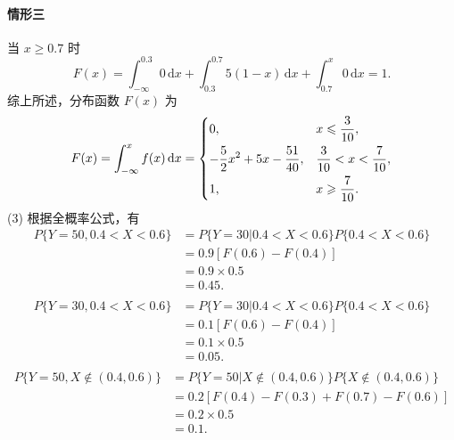 \begin{solution}
    \paragraph{情形三} 当 $x \geqslant 0.7$ 时
    $$
        F(x) = \int_{-\infty}^{0.3}0\,\mathrm{d}x + \int_{0.3}^{0.7}5(1-x)\,\mathrm{d}x + \int_{0.7}^{x} 0\,\mathrm{d}x = 1.
    $$
    综上所述，分布函数 $F(x)$ 为
    $$
        F(x) = \int_{-\infty}^x f(x) \,\mathrm{d}x
        = \begin{dcases}
            0,                                    & x \leqslant \frac{3}{10},    \\
            -\frac{5}{2}x^2 + 5x - \frac{51}{40}, & \frac{3}{10}<x<\frac{7}{10}, \\
            1,                                    & x \geqslant \frac{7}{10}.
        \end{dcases}
    $$
    (3) 根据全概率公式，有
    $$
        \begin{aligned}
            P\{Y=50 , 0.4<X<0.6\}
             & = P\{Y=30 | 0.4<X<0.6\}P\{0.4<X<0.6\} \\
             & = 0.9 [F(0.6)-F(0.4)]                 \\
             & = 0.9 \times 0.5                      \\
             & = 0.45.                               \\
        \end{aligned}
    $$
    $$
        \begin{aligned}
            P\{Y=30, 0.4<X<0.6\}
             & = P\{Y=30 | 0.4<X<0.6\}P\{0.4<X<0.6\} \\
             & = 0.1 [F(0.6)-F(0.4)]                 \\
             & = 0.1 \times 0.5                      \\
             & = 0.05.                               \\
        \end{aligned}
    $$
    $$
        \begin{aligned}
            P\{Y=50 , X \notin (0.4,0.6)\}
             & = P\{Y=50 |  X \notin (0.4,0.6)\}P\{X \notin (0.4,0.6)\} \\
             & = 0.2 [F(0.4)-F(0.3) + F(0.7)-F(0.6)]                    \\
             & = 0.2 \times 0.5                                         \\
             & = 0.1.                                                   \\

\end{aligned}$$
\end{solution}
